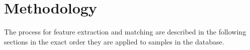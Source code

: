 
\chapter{Methodology\label{ch:methodology}}

The process for feature extraction and matching are described in the following sections in the exact order they are applied to samples in the database.




